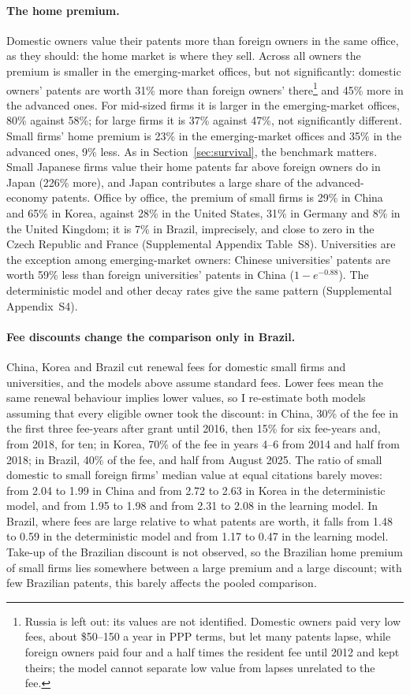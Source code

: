 \paragraph{The home premium.} Domestic owners value their patents more than foreign owners in the same office, as
they should: the home market is where they sell. Across all owners the premium is smaller in the emerging-market offices, but not significantly: domestic owners'
patents are worth 31\% more than foreign owners' there\footnote{\label{fn:russia}Russia is left out:
its values are not identified. Domestic owners paid very low fees, about \$50--150 a year in PPP terms, but let many
patents lapse, while foreign owners paid four and a half times the resident fee until 2012 and kept theirs; the model
cannot separate low value from lapses unrelated to the fee.} and 45\% more
in the advanced ones. For mid-sized firms it is larger in the emerging-market offices, 80\% against 58\%; for large
firms it is 37\% against 47\%, not significantly different. Small firms' home premium is 23\% in the
emerging-market offices and 35\% in the advanced ones, 9\% less. As in Section~\ref{sec:survival}, the benchmark matters. Small
Japanese firms value their home patents far above foreign owners do in Japan (226\% more), and Japan contributes a
large share of the advanced-economy patents. Office by office, the premium of small firms is 29\% in China and
65\% in Korea, against 28\% in the United States, 31\% in Germany and 8\% in the United Kingdom; it is 7\% in Brazil,
imprecisely, and close to zero in the Czech Republic and France (Supplemental Appendix Table~S8). Universities are the exception among
emerging-market owners: Chinese universities' patents are worth 59\% less than foreign universities' patents in China
($1-e^{-0.88}$). The deterministic model and other decay rates give the same pattern (Supplemental Appendix~S4).

\paragraph{Fee discounts change the comparison only in Brazil.} China, Korea and Brazil cut renewal fees for domestic
small firms and universities, and the models above assume standard fees. Lower fees mean the same renewal behaviour
implies lower values, so I re-estimate both models assuming that every eligible owner took the discount: in China,
30\% of the fee in the first three fee-years after grant until 2016, then 15\% for six fee-years and, from 2018, for
ten; in Korea, 70\% of the fee in years 4--6 from 2014 and half from 2018; in Brazil, 40\% of the fee, and half from
August 2025. The ratio of small domestic to
small foreign firms' median value at equal citations barely moves: from 2.04 to 1.99 in China and from 2.72 to 2.63 in
Korea in the deterministic model, and from 1.95 to 1.98 and from 2.31 to 2.08 in the learning model. In Brazil,
where fees are large relative to what patents are worth, it falls from 1.48 to 0.59 in the deterministic model and from
1.17 to 0.47 in the learning model. Take-up of the Brazilian discount is not observed, so the Brazilian home premium
of small firms lies somewhere between a large premium and a large discount; with few Brazilian patents, this barely
affects the pooled comparison. 

